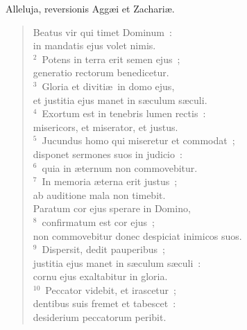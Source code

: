 \bchapter
\lettrine[lines=3,image=true,loversize=0.05,lraise=-0.03]{A}{}lleluja, reversionis Agg\ae i et Zachari\ae . \begin{flushleft}\begin{verse}\vspace{6pt}Beatus vir qui timet Dominum~:\\ in mandatis ejus volet nimis.\\
${}^{2}$~Potens in terra erit semen ejus~;\\ generatio rectorum benedicetur.\\
${}^{3}$~Gloria et diviti\ae\ in domo ejus,\\ et justitia ejus manet in s\ae culum s\ae culi.\\
${}^{4}$~Exortum est in tenebris lumen rectis~:\\ misericors, et miserator, et justus.\\
${}^{5}$~Jucundus homo qui miseretur et commodat~;\\ disponet sermones suos in judicio~:\\
${}^{6}$~quia in \ae ternum non commovebitur.\\
${}^{7}$~In memoria \ae terna erit justus~;\\ ab auditione mala non timebit.\\ Paratum cor ejus sperare in Domino,\\
${}^{8}$~confirmatum est cor ejus~;\\ non commovebitur donec despiciat inimicos suos.\\
${}^{9}$~Dispersit, dedit pauperibus~;\\ justitia ejus manet in s\ae culum s\ae culi~:\\ cornu ejus exaltabitur in gloria.\\
${}^{10}$~Peccator videbit, et irascetur~;\\ dentibus suis fremet et tabescet~:\\ desiderium peccatorum peribit.\end{verse}\end{flushleft}




